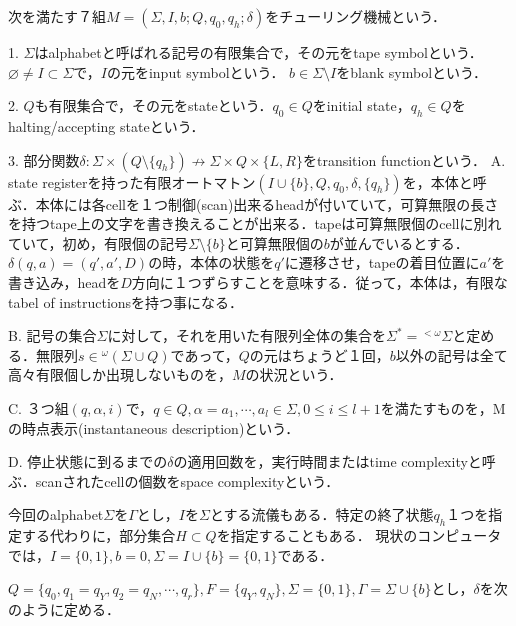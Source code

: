\documentclass[uplatex, 12pt, dvipdfmx]{jsreport}
\begin{document}
\begin{screen}\begin{definition}
    次を満たす７組$M=(\Sigma,I,b;Q,q_0,q_h;\delta)$をチューリング機械という．

    1. $\Sigma$はalphabetと呼ばれる記号の有限集合で，その元をtape symbolという．$\varnothing\ne I\subset\Sigma$で，$I$の元をinput symbolという．
    $b\in\Sigma\setminus I$をblank symbolという．

    2. $Q$も有限集合で，その元をstateという．$q_0\in Q$をinitial state，$q_h\in Q$をhalting/accepting stateという．

    3. 部分関数$\delta:\Sigma\times (Q\setminus\{q_h\})\nrightarrow\Sigma\times Q\times\{L,R\}$をtransition functionという．
    \vspace{2ex}
    A. state registerを持った有限オートマトン$(I\cup\{b\},Q,q_0,\delta,\{q_h\})$を，本体と呼ぶ．本体には各cellを１つ制御(scan)出来るheadが付いていて，可算無限の長さを持つtape上の文字を書き換えることが出来る．tapeは可算無限個のcellに別れていて，初め，有限個の記号$\Sigma\setminus\{b\}$と可算無限個の$b$が並んでいるとする．
    $\delta(q,a)=(q',a',D)$の時，本体の状態を$q'$に遷移させ，tapeの着目位置に$a'$を書き込み，headを$D$方向に１つずらすことを意味する．従って，本体は，有限なtabel of instructionsを持つ事になる．

    B. 記号の集合$\Sigma$に対して，それを用いた有限列全体の集合を$\Sigma^*={}^{<\omega}\Sigma$と定める．無限列$s\in {}^\omega(\Sigma\cup Q)$であって，$Q$の元はちょうど１回，$b$以外の記号は全て高々有限個しか出現しないものを，$M$の状況という．

    C. ３つ組$(q,\alpha,i)$で，$q\in Q, \alpha=a_1,\cdots, a_l\in\Sigma, 0\le i\le l+1$を満たすものを，Mの時点表示(instantaneous description)という．

    D. 停止状態に到るまでの$\delta$の適用回数を，実行時間またはtime complexityと呼ぶ．scanされたcellの個数をspace complexityという．
\end{definition}\end{screen}
\begin{notation}
    今回のalphabet$\Sigma$を$\Gamma$とし，$I$を$\Sigma$とする流儀もある．特定の終了状態$q_h$１つを指定する代わりに，部分集合$H\subset Q$を指定することもある．
    現状のコンピュータでは，$I=\{0,1\}, b=0, \Sigma=I\cup\{b\}=\{0,1\}$である．
\end{notation}
\begin{example}
    
\end{example}
\begin{example}[偶奇判定アルゴリズム]
    $Q=\{q_0,q_1=q_Y,q_2=q_N,\cdots,q_r\}, F=\{q_Y,q_N\}, \Sigma=\{0,1\}, \Gamma=\Sigma\cup\{b\}$とし，$\delta$を次のように定める．
\end{example}
\end{document}
